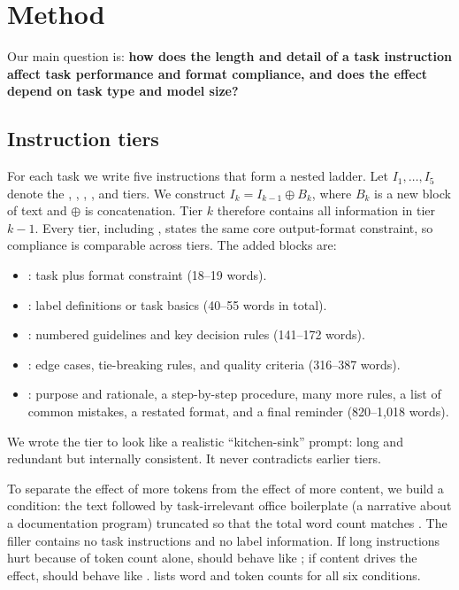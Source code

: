 \section{Method}
\label{sec:method}

Our main question is: {\bf how does the length and detail of a task instruction affect task performance and format compliance, and does the effect depend on task type and model size?}

\subsection{Instruction tiers}
\label{sec:tiers}

For each task we write five instructions that form a nested ladder.
Let $I_1,\dots,I_5$ denote the \minimal, \concise, \standard, \detailed, and \exhaustive tiers.
We construct $I_k = I_{k-1} \oplus B_k$, where $B_k$ is a new block of text and $\oplus$ is concatenation.
Tier $k$ therefore contains all information in tier $k-1$.
Every tier, including \minimal, states the same core output-format constraint, so compliance is comparable across tiers.
The added blocks are:
\begin{itemize}[leftmargin=*,itemsep=0pt,topsep=0pt]
    \item \minimal: task plus format constraint (18--19 words).
    \item \concise: label definitions or task basics (40--55 words in total).
    \item \standard: numbered guidelines and key decision rules (141--172 words).
    \item \detailed: edge cases, tie-breaking rules, and quality criteria (316--387 words).
    \item \exhaustive: purpose and rationale, a step-by-step procedure, many more rules, a list of common mistakes, a restated format, and a final reminder (820--1{,}018 words).
\end{itemize}
We wrote the \exhaustive tier to look like a realistic ``kitchen-sink'' prompt: long and redundant but internally consistent.
It never contradicts earlier tiers.

To separate the effect of more tokens from the effect of more content, we build a \padded condition: the \standard text followed by task-irrelevant office boilerplate (a narrative about a documentation program) truncated so that the total word count matches \exhaustive.
The filler contains no task instructions and no label information.
If long instructions hurt because of token count alone, \padded should behave like \exhaustive; if content drives the effect, \padded should behave like \standard.
 lists word and token counts for all six conditions.

